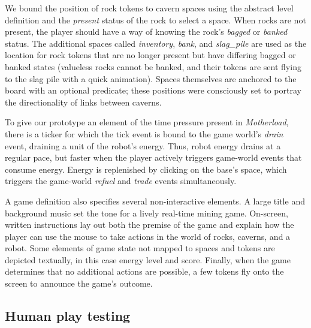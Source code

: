 \documentclass[letterpaper]{article}
\begin{document}
We bound the position of rock tokens to cavern spaces using the abstract level
definition and the \emph{present} status of the rock to select a space. When
rocks are not present, the player should have a way of knowing the rock's
\emph{bagged} or \emph{banked} status. The additional spaces called
\emph{inventory}, \emph{bank}, and \emph{slag\_pile} are used as the location
for rock tokens that are no longer present but have differing bagged or banked
states (valueless rocks cannot be banked, and their tokens are sent flying to
the slag pile with a quick animation). Spaces themselves are anchored to the
board with an optional predicate; these positions were consciously set to
portray the directionality of links between caverns.

To give our prototype an element of the time pressure present in
\emph{Motherload}, there is a ticker for which the tick event is bound to the
game world's \emph{drain} event, draining a unit of the robot's energy.
Thus, robot energy drains at a regular pace, but faster when the player
actively triggers game-world events that consume energy. Energy is replenished
by clicking on the base's space, which triggers the game-world \emph{refuel} and
\emph{trade} events simultaneously.

A game definition also specifies several non-interactive elements.
A large title and background music set the tone for a lively real-time mining
game. On-screen, written instructions lay out both the premise of the game and
explain how the player can use the mouse to take actions in the world of rocks,
caverns, and a robot. Some elements of game state not mapped to spaces and
tokens are depicted textually, in this case energy level and score.
Finally, when the game determines that no additional actions are possible, a
few tokens fly onto the screen to announce the game's outcome.

\subsection{Human play testing}
\end{document}
